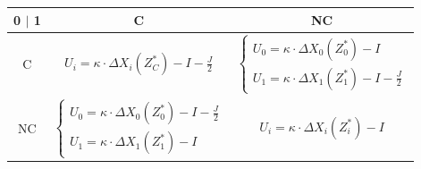 \begin{center}
\begin{tabular}{ |c|c|c| } 
 \hline
 0 $|$ 1  & C & NC \\ \hline
 C & $U_i = \kappa \cdot \Delta X_i(Z^{\ast}_C) - I - \frac{J}{2}$
   & $\begin{cases}U_0 = \kappa \cdot \Delta X_0(Z^{\ast}_0)-I \\U_1 = \kappa \cdot \Delta X_1(Z^{\ast}_1)-I - \frac{J}{2}\end{cases}$ \\ \hline
 NC & $\begin{cases}U_0 = \kappa \cdot \Delta X_0(Z^{\ast}_0)-I - \frac{J}{2}\\U_1 = \kappa \cdot \Delta X_1(Z^{\ast}_1)-I\end{cases}$
   & $U_i = \kappa \cdot \Delta X_i(Z^{\ast}_i) - I$ \\
 \hline
\end{tabular}
\end{center}



